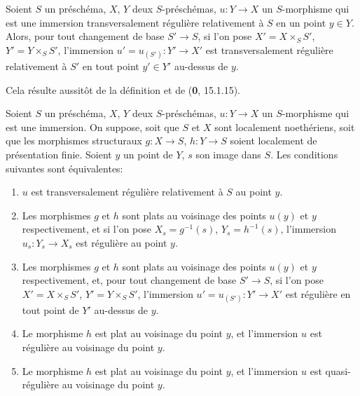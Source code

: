 \begin{proposition}[19.2.3]
\label{IV.19.2.3}
Soient $S$ un préschéma, $X$, $Y$ deux $S$-préschémas, $u:Y\to X$ un $S$-morphisme qui est une immersion transversalement régulière relativement à $S$ en un point $y\in Y$. Alors, pour tout changement de base $S'\to S$, si l'on pose $X'=X\times_S S'$, $Y'=Y\times_S S'$, l'immersion $u'=u_{(S')}:Y'\to X'$ est transversalement régulière relativement à $S'$ en tout point $y'\in Y'$ au-dessus de $y$.
\end{proposition}

Cela résulte aussitôt de la définition et de (\textbf{0}, 15.1.15).

\begin{proposition}[19.2.4]
\label{IV.19.2.4}
Soient $S$ un préschéma, $X$, $Y$ deux $S$-préschémas, $u:Y\to X$ un $S$-morphisme qui est une immersion. On suppose, \textup{soit} que $S$ et $X$ sont localement noethériens, \textup{soit} que les morphismes structuraux $g:X\to S$, $h:Y\to S$ soient localement de présentation finie. Soient $y$ un point de $Y$, $s$ son image dans $S$. Les conditions suivantes sont équivalentes:
\begin{enumerate}
  \item[\textup{a)}] $u$ est transversalement régulière relativement à $S$ au point $y$.
  \item[\textup{b)}] Les morphismes $g$ et $h$ sont plats au voisinage des points $u(y)$ et $y$ respectivement, et si l'on pose $X_s=g^{-1}(s)$, $Y_s=h^{-1}(s)$, l'immersion $u_s:Y_s\to X_s$ est régulière au point $y$.
  \item[\textup{b$'$)}] Les morphismes $g$ et $h$ sont plats au voisinage des points $u(y)$ et $y$ respectivement, et, pour tout changement de base $S'\to S$, si l'on pose $X'=X\times_S S'$, $Y'=Y\times_S S'$, l'immersion $u'=u_{(S')}:Y'\to X'$ est régulière en tout point de $Y'$ au-dessus de $y$.
  \item[\textup{c)}] Le morphisme $h$ est plat au voisinage du point $y$, et l'immersion $u$ est régulière au voisinage du point $y$.


  \item[\textup{c$'$)}] Le morphisme $h$ est plat au voisinage du point $y$, et l'immersion $u$ est quasi-régulière au voisinage du point $y$.
\end{enumerate}
\end{proposition}

